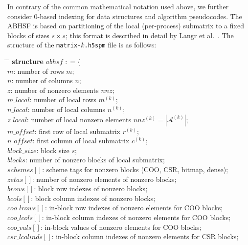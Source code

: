 \documentclass[10pt,a4paper]{article}
\providecommand{\nnz}{\ensuremath{\mathit{nnz}}\xspace}
\providecommand{\var}[1]{\ensuremath{\mathit{#1}}\xspace}
\begin{document}
In contrary of the common mathematical notation used above, we further consider 0-based indexing for data structures and algorithm pseudocodes. The ABHSF is based on partitioning of the local (per-process) submatrix to a fixed blocks of sizes $s\times s$; this format is described in detail by Langr et al.~\cite{Langr:2012b}. The structure of the \texttt{matrix-}$k$\texttt{.h5spm} file is as follows:
\begin{tabbing}
\hspace*{1em} \= \hspace*{8em} \= \kill
\textbf{structure} \var{abhsf} $\mathrel{\mathop:}= \{$ \\
\> \var{m}:           \> number of rows $m$; \\
\> \var{n}:           \> number of columns $n$; \\
\> \var{z}:           \> number of nonzero elements \nnz; \\
\> \var{m\_local}:    \> number of local rows $m^{(k)}$; \\
\> \var{n\_local}:    \> number of local columns $n^{(k)}$; \\
\> \var{z\_local}:    \> number of local nonzero elements $\var{nnz}^{(k)}=|\mathcal{A}^{(k)}|$; \\
\> \var{m\_offset}:   \> first row of local submatrix $r^{(k)}$; \\
\> \var{n\_offset}:   \> first column of local submatrix $c^{(k)}$; \\
\> \var{block\_size}: \> block size $s$; \\
\> \var{blocks}:      \> number of nonzero blocks of local submatrix; \\
\> \var{schemes[]}:   \> scheme tags for nonzero blocks (COO, CSR, bitmap, dense); \\
\> \var{zetas[]}:     \> number of nonzero elements of nonzero blocks; \\
\> \var{brows[]}:     \> block row indexes of nonzero blocks; \\
\> \var{bcols[]}:     \> block column indexes of nonzero blocks; \\
\> \var{coo\_lrows[]}:     \> in-block row indexes of nonzero elements for COO blocks; \\
\> \var{coo\_lcols[]}:     \> in-block column indexes of nonzero elements for COO blocks; \\
\> \var{coo\_vals[]}:      \> in-block values of nonzero elements for COO blocks; \\
\> \var{csr\_lcolinds[]}:  \> in-block column indexes of nonzero elements for CSR blocks; \\

\end{tabbing}
\end{document}
